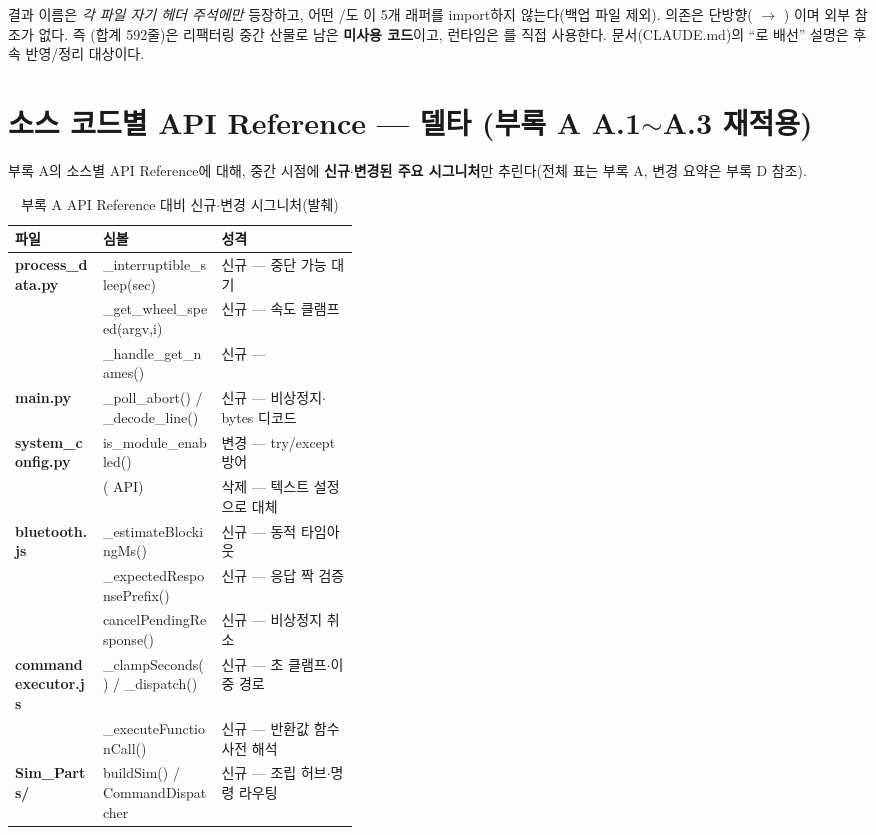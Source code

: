 \begin{notebox}
\small
{} 결과 
이름은 \emph{각 파일 자기 헤더 주석에만} 등장하고, 어떤 /도 이 5개 래퍼를
import하지 않는다(백업 파일 제외). 의존은 단방향( $\to$ )
이며 외부 참조가 없다. 즉 (합계 592줄)은 리팩터링 중간 산물로 남은
\textbf{미사용 코드}이고, 런타임은 를 직접 사용한다. 문서(CLAUDE.md)의
``로 배선'' 설명은 후속 반영/정리 대상이다.
\end{notebox}

\section{소스 코드별 API Reference --- 델타 (부록 A A.1$\sim$A.3 재적용)}
부록 A의 소스별 API Reference에 대해, 중간 시점에 \textbf{신규$\cdot$변경된 주요 시그니처}만
추린다(전체 표는 부록 A, 변경 요약은 부록 D 참조).

\begin{table}[htbp]\centering\small
\caption{부록 A API Reference 대비 신규$\cdot$변경 시그니처(발췌)}
\renewcommand{\arraystretch}{1.22}
\begin{tabularx}{\linewidth}{@{}>{\sffamily\bfseries}l >{\ttfamily\footnotesize}l L{0.40\linewidth}@{}}
\toprule
\sffamily 파일 & \sffamily 심볼 & \sffamily 성격 \\
\midrule
process\_data.py & \_interruptible\_sleep(sec) & 신규 --- 중단 가능 대기 \\
                 & \_get\_wheel\_speed(argv,i) & 신규 --- 속도 클램프 \\
                 & \_handle\_get\_names() & 신규 ---  \\
main.py & \_poll\_abort() / \_decode\_line() & 신규 --- 비상정지$\cdot$bytes 디코드 \\
system\_config.py & is\_module\_enabled() & 변경 --- try/except 방어 \\
                  & ( API) & 삭제 --- 텍스트 설정으로 대체 \\
bluetooth.js & \_estimateBlockingMs() & 신규 --- 동적 타임아웃 \\
             & \_expectedResponsePrefix() & 신규 --- 응답 짝 검증 \\
             & cancelPendingResponse() & 신규 --- 비상정지 취소 \\
commandexecutor.js & \_clampSeconds() / \_dispatch() & 신규 --- 초 클램프$\cdot$이중 경로 \\
                   & \_executeFunctionCall() & 신규 --- 반환값 함수 사전 해석 \\
Sim\_Parts/ & buildSim() / CommandDispatcher & 신규 --- 조립 허브$\cdot$명령 라우팅 \\
\bottomrule
\end{tabularx}
\end{table}

